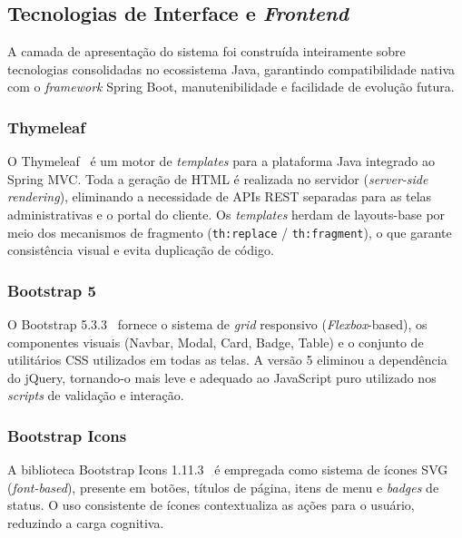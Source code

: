 
\subsection{Tecnologias de Interface e \textit{Frontend}}

A camada de apresentação do sistema foi construída inteiramente sobre
tecnologias consolidadas no ecossistema Java, garantindo compatibilidade
nativa com o \textit{framework} Spring Boot, manutenibilidade e facilidade de
evolução futura.

\subsubsection{Thymeleaf}
O Thymeleaf~\cite{thymeleaf} é um motor de \textit{templates} para a plataforma
Java integrado ao Spring MVC. Toda a geração de HTML é realizada no servidor
(\textit{server-side rendering}), eliminando a necessidade de APIs REST separadas
para as telas administrativas e o portal do cliente. Os \textit{templates} herdam
de layouts-base por meio dos mecanismos de fragmento
(\texttt{th:replace} / \texttt{th:fragment}), o que garante consistência visual
e evita duplicação de código.

\subsubsection{Bootstrap 5}
O Bootstrap 5.3.3~\cite{bootstrap5} fornece o sistema de \textit{grid} responsivo
(\textit{Flexbox}-based), os componentes visuais (Navbar, Modal, Card, Badge,
Table) e o conjunto de utilitários CSS utilizados em todas as telas.
A versão 5 eliminou a dependência do jQuery, tornando-o mais leve e adequado ao
JavaScript puro utilizado nos \textit{scripts} de validação e interação.

\subsubsection{Bootstrap Icons}
A biblioteca Bootstrap Icons 1.11.3~\cite{bootstrapicons} é empregada como
sistema de ícones SVG (\textit{font-based}), presente em botões, títulos de página,
itens de menu e \textit{badges} de status. O uso consistente de ícones
contextualiza as ações para o usuário, reduzindo a carga cognitiva.

